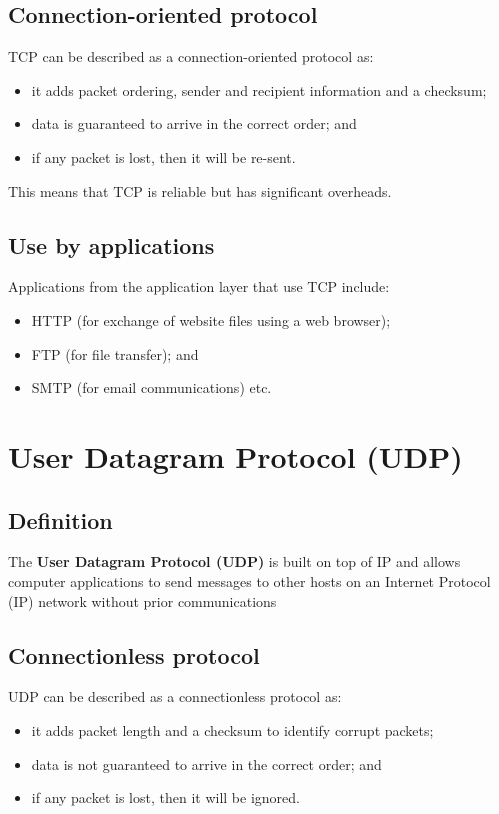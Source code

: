 \documentclass[a4paper]{systems-software}
\begin{document}
\subsection*{Connection-oriented protocol}

TCP can be described as a connection-oriented protocol as:
\begin{itemize}
	\item it adds packet ordering, sender and recipient information and a checksum;
	\item data is guaranteed to arrive in the correct order; and
	\item if any packet is lost, then it will be re-sent.
\end{itemize}

This means that TCP is reliable but has significant overheads.


\subsection*{Use by applications}

Applications from the application layer that use TCP include:
\begin{itemize}
	\item HTTP (for exchange of website files using a web browser);
	\item FTP (for file transfer); and
	\item SMTP (for email communications) etc.
\end{itemize}


\section*{User Datagram Protocol (UDP)}

\subsection*{Definition}

The \textbf{User Datagram Protocol (UDP)} is built on top of IP and allows computer applications to send messages to other hosts on an Internet Protocol (IP) network without prior communications


\subsection*{Connectionless protocol}

UDP can be described as a connectionless protocol as:
\begin{itemize}
	\item it adds packet length and a checksum to identify corrupt packets;
	\item data is not guaranteed to arrive in the correct order; and
	\item if any packet is lost, then it will be ignored.
\end{itemize}
\end{document}
